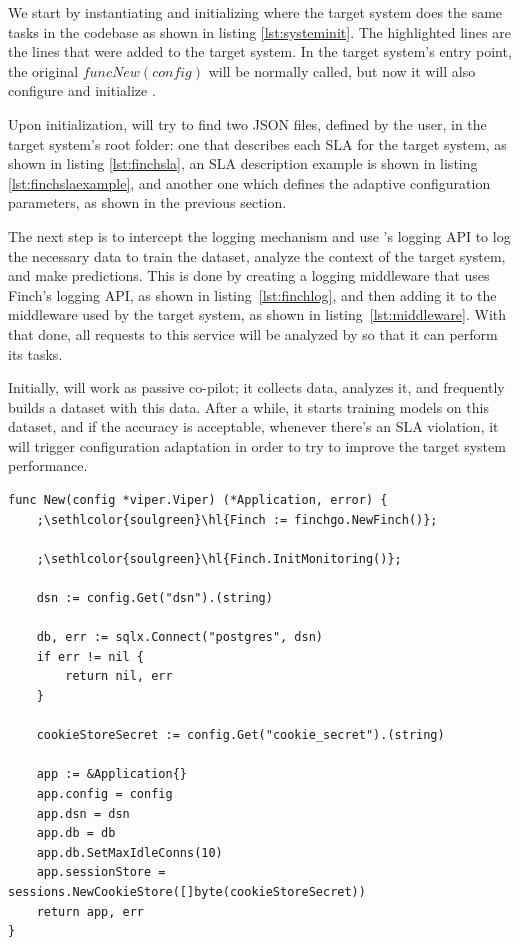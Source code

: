 We start by instantiating and initializing \projectname{} where the target system does the same tasks in the codebase as shown in listing \ref{lst:systeminit}. The highlighted lines are the lines that were added to the target system. In the target system's entry point, the original $func New(config)$ will be normally called, but now it will also configure and initialize \projectname{}.

Upon initialization, \projectname{} will try to find two JSON files, defined by the user, in the target system's root folder: one that describes each SLA for the target system, as shown in listing \ref{lst:finchsla}, an SLA description example is shown in listing \ref{lst:finchslaexample}, and another one which defines the adaptive configuration parameters, as shown in the previous section.

The next step is to intercept the logging mechanism and use \projectname{}'s logging API to log the necessary data to train the dataset, analyze the context of the target system, and make predictions. This is done by creating a logging middleware that uses Finch's logging API, as shown in listing~\ref{lst:finchlog}, and then adding it to the middleware used by the target system, as shown in listing~\ref{lst:middleware}. With that done, all requests to this service will be analyzed by \projectname{} so that it can perform its tasks.

Initially, \projectname{} will work as passive co-pilot; it collects data, analyzes it, and frequently builds a dataset with this data. After a while, it starts training models on this dataset, and if the accuracy is acceptable, whenever there's an SLA violation, it will trigger configuration adaptation in order to try to improve the target system performance.

\begin{lstlisting}[float,floatplacement=H,escapechar=;,caption={Initializing the target system and Finch},label={lst:systeminit}]
func New(config *viper.Viper) (*Application, error) {
	;\sethlcolor{soulgreen}\hl{Finch := finchgo.NewFinch()};
	
	;\sethlcolor{soulgreen}\hl{Finch.InitMonitoring()};

	dsn := config.Get("dsn").(string)
	
	db, err := sqlx.Connect("postgres", dsn)
	if err != nil {
		return nil, err
	}

	cookieStoreSecret := config.Get("cookie_secret").(string)

	app := &Application{}
	app.config = config
	app.dsn = dsn
	app.db = db
	app.db.SetMaxIdleConns(10)
	app.sessionStore = sessions.NewCookieStore([]byte(cookieStoreSecret))
	return app, err
}
\end{lstlisting}

